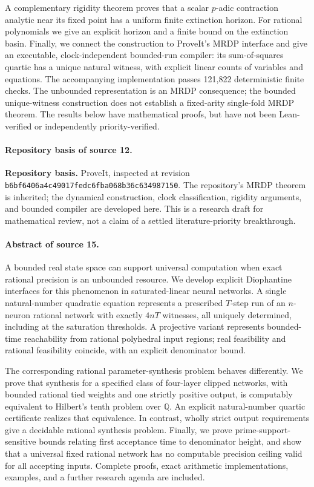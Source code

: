 \documentclass[11pt,letterpaper]{article}
\numberwithin{equation}{section}
\theoremstyle{definition}
\theoremstyle{remark}
\newcommand{\Q}{\mathbb Q}
\newcommand{\code}[1]{\nolinkurl{#1}}
\begin{document}
A complementary rigidity theorem proves that a scalar $p$-adic contraction
analytic near its fixed point has a uniform finite extinction horizon. For
rational polynomials we give an explicit horizon and a finite bound on the
extinction basin. Finally, we connect the construction to ProveIt's MRDP
interface and give an executable, clock-independent bounded-run compiler:
its sum-of-squares quartic has a unique natural witness, with explicit linear
counts of variables and equations. The accompanying implementation passes
121,822 deterministic finite checks. The unbounded representation is an
MRDP consequence; the bounded unique-witness construction does not establish
a fixed-arity single-fold MRDP theorem. The results below have mathematical
proofs, but have not been Lean-verified or independently priority-verified.
\paragraph{Repository basis of source 12.}
\textbf{Repository basis.} ProveIt, inspected at revision
\code{b6bf6406a4c49017fedc6fba068b36c634987150}.
The repository's MRDP theorem is inherited; the dynamical construction,
clock classification, rigidity arguments, and bounded compiler are developed
here. This is a research draft for mathematical review, not a claim of a
settled literature-priority breakthrough.
\paragraph{Abstract of source 15.}
A bounded real state space can support universal computation when exact rational
precision is an unbounded resource. We develop explicit Diophantine interfaces
for this phenomenon in saturated-linear neural networks. A single natural-number
quadratic equation represents a prescribed $T$-step run of an $n$-neuron rational
network with exactly $4nT$ witnesses, all uniquely determined, including at the
saturation thresholds. A projective variant represents bounded-time reachability
from rational polyhedral input regions; real feasibility and rational feasibility
coincide, with an explicit denominator bound.

The corresponding rational parameter-synthesis problem behaves differently.
We prove that synthesis for a specified class of four-layer clipped networks,
with bounded rational tied weights and one strictly positive output, is
computably equivalent to Hilbert's tenth problem over $\Q$. An explicit
natural-number quartic certificate realizes that equivalence. In contrast,
wholly strict output requirements give a decidable rational synthesis problem.
Finally, we prove
prime-support-sensitive bounds relating first acceptance time to denominator
height, and show that a universal fixed rational network has no computable
precision ceiling valid for all accepting inputs. Complete proofs, exact
arithmetic implementations, examples, and a further research agenda are included.
\end{document}
